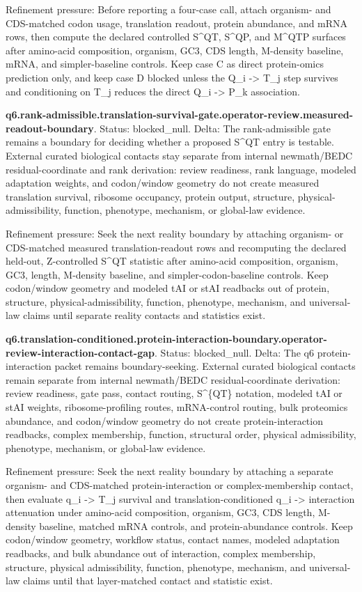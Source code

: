 Refinement pressure: Before reporting a four-case call, attach organism- and CDS-matched codon usage, translation readout, protein abundance, and mRNA rows, then compute the declared controlled S\textasciicircum{}QT, S\textasciicircum{}QP, and M\textasciicircum{}QTP surfaces after amino-acid composition, organism, GC3, CDS length, M-density baseline, mRNA, and simpler-baseline controls. Keep case C as direct protein-omics prediction only, and keep case D blocked unless the Q\_i -> T\_j step survives and conditioning on T\_j reduces the direct Q\_i -> P\_k association.

\textbf{q6.rank-admissible.translation-survival-gate.operator-review.measured-readout-boundary}. Status: blocked\_null. Delta: The rank-admissible gate remains a boundary for deciding whether a proposed S\textasciicircum{}QT entry is testable. External curated biological contacts stay separate from internal newmath/BEDC residual-coordinate and rank derivation: review readiness, rank language, modeled adaptation weights, and codon/window geometry do not create measured translation survival, ribosome occupancy, protein output, structure, physical-admissibility, function, phenotype, mechanism, or global-law evidence.

Refinement pressure: Seek the next reality boundary by attaching organism- or CDS-matched measured translation-readout rows and recomputing the declared held-out, Z-controlled S\textasciicircum{}QT statistic after amino-acid composition, organism, GC3, length, M-density baseline, and simpler-codon-baseline controls. Keep codon/window geometry and modeled tAI or stAI readbacks out of protein, structure, physical-admissibility, function, phenotype, mechanism, and universal-law claims until separate reality contacts and statistics exist.

\textbf{q6.translation-conditioned.protein-interaction-boundary.operator-review-interaction-contact-gap}. Status: blocked\_null. Delta: The q6 protein-interaction packet remains boundary-seeking. External curated biological contacts remain separate from internal newmath/BEDC residual-coordinate derivation: review readiness, gate pass, contact routing, S\textasciicircum{}\{QT\} notation, modeled tAI or stAI weights, ribosome-profiling routes, mRNA-control routing, bulk proteomics abundance, and codon/window geometry do not create protein-interaction readbacks, complex membership, function, structural order, physical admissibility, phenotype, mechanism, or global-law evidence.

Refinement pressure: Seek the next reality boundary by attaching a separate organism- and CDS-matched protein-interaction or complex-membership contact, then evaluate q\_i -> T\_j survival and translation-conditioned q\_i -> interaction attenuation under amino-acid composition, organism, GC3, CDS length, M-density baseline, matched mRNA controls, and protein-abundance controls. Keep codon/window geometry, workflow status, contact names, modeled adaptation readbacks, and bulk abundance out of interaction, complex membership, structure, physical admissibility, function, phenotype, mechanism, and universal-law claims until that layer-matched contact and statistic exist.

